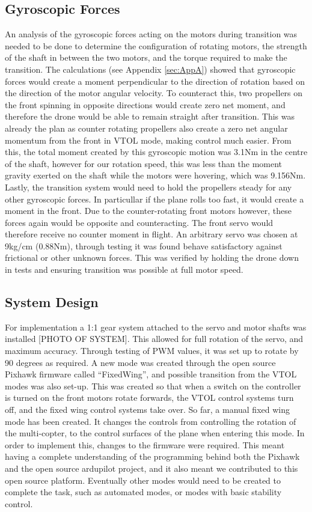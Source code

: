 \subsection{Gyroscopic Forces}
An analysis of the gyroscopic forces acting on the motors during transition was needed to be done to determine the configuration of rotating motors, the strength of the shaft in between the two motors, and the torque required to make the transition. The calculations (see Appendix \ref{sec:AppA}) showed that gyroscopic forces would create a moment perpendicular to the direction of rotation based on the direction of the motor angular velocity. To counteract this, two propellers on the front spinning in opposite directions would create zero net moment, and therefore the drone would be able to remain straight after transition. This was already the plan as counter rotating propellers also create a zero net angular momentum from the front in VTOL mode, making control much easier.  From this, the total moment created by this gyroscopic motion was 3.1Nm in the centre of the shaft, however for our rotation speed, this was less than the moment gravity exerted on the shaft while the motors were hovering, which was 9.156Nm. Lastly, the transition system would need to hold the propellers steady for any other gyroscopic forces. In particullar if the plane rolls too fast, it would create a moment in the front. Due to the counter-rotating front motors however, these forces again would be opposite and counteracting. The front servo would therefore receive no counter moment in flight. An arbitrary servo was chosen at 9kg/cm (0.88Nm), through testing it was found behave satisfactory against frictional or other unknown forces. This was verified by holding the drone down in tests and ensuring transition was possible at full motor speed.

\subsection{System Design}
For implementation a 1:1 gear system attached to the servo and motor shafts was installed \color{red}[PHOTO OF SYSTEM]\color{black}. This allowed for full rotation of the servo, and maximum accuracy.  Through testing of PWM values, it was set up to rotate by 90 degrees as required. A new mode was created through the open source Pixhawk firmware called “FixedWing”, and possible transition from the VTOL modes was also set-up. This was created so that when a switch on the controller is turned on the front motors rotate forwards, the VTOL control systems turn off, and the fixed wing control systems take over. So far, a manual fixed wing mode has been created. It changes the controls from controlling the rotation of the multi-copter, to the control surfaces of the plane when entering this mode. In order to implement this, changes to the firmware were required.  This meant having  a complete understanding of the programming behind both the Pixhawk and the open source ardupilot project, and it also meant we contributed to this open source platform. Eventually other modes would need to be created to complete the task, such as automated modes, or modes with basic stability control. 
\\ [TALK MORE ABOUT MODES AND HOW WHAT THE SOFTWARE HAS DONE]

